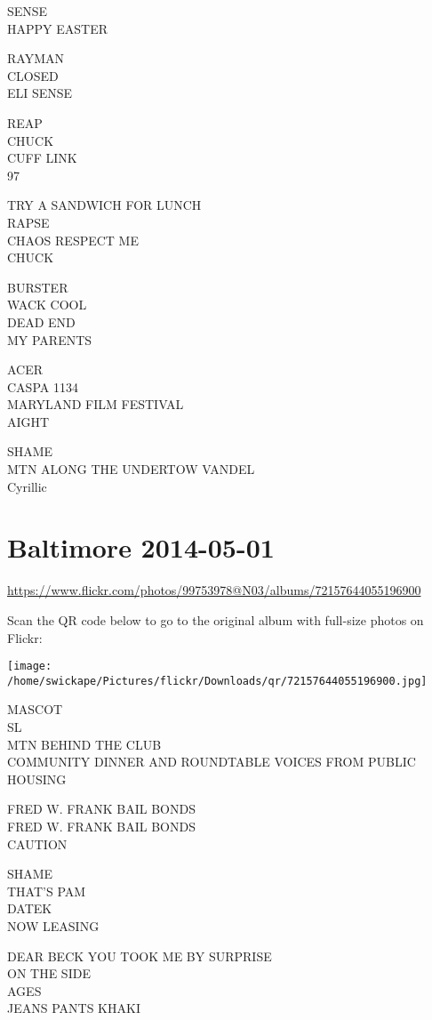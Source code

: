 \documentclass[10pt,letterpaper]{article}
\begin{document}
SENSE\\
HAPPY EASTER

RAYMAN\\
CLOSED\\
ELI SENSE

REAP\\
CHUCK\\
CUFF LINK\\
97

TRY A SANDWICH FOR LUNCH\\
RAPSE\\
CHAOS RESPECT ME\\
CHUCK

BURSTER\\
WACK COOL\\
DEAD END\\
MY PARENTS

ACER\\
CASPA 1134\\
MARYLAND FILM FESTIVAL\\
AIGHT

SHAME\\
MTN ALONG THE UNDERTOW VANDEL\\
Cyrillic


\section*{Baltimore 2014-05-01}

\url{https://www.flickr.com/photos/99753978@N03/albums/72157644055196900}

Scan the QR code below to go to the original album with full-size photos on Flickr:

\texttt{[image: /home/swickape/Pictures/flickr/Downloads/qr/72157644055196900.jpg]}


MASCOT\\
SL\\
MTN BEHIND THE CLUB\\
COMMUNITY DINNER AND ROUNDTABLE VOICES FROM PUBLIC HOUSING

FRED W. FRANK BAIL BONDS\\
FRED W. FRANK BAIL BONDS\\
CAUTION

SHAME\\
THAT'S PAM\\
DATEK\\
NOW LEASING

DEAR BECK YOU TOOK ME BY SURPRISE\\
ON THE SIDE\\
AGES\\
JEANS PANTS KHAKI
\end{document}
